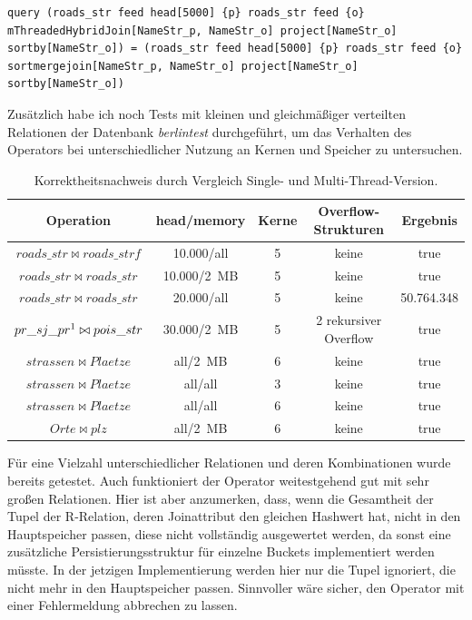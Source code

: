 \documentclass[a4paper,12pt,twoside]{article}
\newcommand{\Fb}[1]{\textit{#1}} %
\begin{document}
{\begin{minipage}{\linewidth}
	\begin{lstlisting}[caption={Beispiel Testqueries für den Join-Operator}, label=list:testjoin]
	query (roads_str feed head[5000] {p} roads_str feed {o} mThreadedHybridJoin[NameStr_p, NameStr_o] project[NameStr_o] sortby[NameStr_o]) = (roads_str feed head[5000] {p} roads_str feed {o} sortmergejoin[NameStr_p, NameStr_o] project[NameStr_o] sortby[NameStr_o])
	\end{lstlisting}
\end{minipage}

Zusätzlich habe ich noch Tests mit kleinen und gleichmäßiger verteilten Relationen der Datenbank \Fb{berlintest} durchgeführt, um das Verhalten des Operators bei unterschiedlicher Nutzung an Kernen und Speicher zu untersuchen. 

\begin{table}
	\centering
	\begin{tabular}{|c|c|c|c|c|}
		\hline 
		Operation & head/memory & Kerne & Overflow-Strukturen & Ergebnis \\ 
		\hline 
		$roads\_str \bowtie roads\_strf$ & 10.000/all & 5 & keine & true \\ 
		\hline 
		$roads\_str \bowtie roads\_str$ & 10.000/2~MB & 5 & keine & true \\ 
		\hline 
		$roads\_str \bowtie roads\_str$ & 20.000/all & 5 & keine & 50.764.348 \\ 
		\hline 
		$pr\_sj\_pr\footnotemark \bowtie pois\_str$ & 30.000/2~MB & 5 & 2 rekursiver Overflow & true \\ 
		\hline 
		$strassen \bowtie Plaetze$ & all/2~MB & 6 & keine  & true \\ 
		\hline
		$strassen \bowtie Plaetze$ & all/all & 3 & keine & true \\ 
		\hline
		$strassen \bowtie Plaetze$ & all/all & 6 & keine & true \\ 
		\hline
		$Orte \bowtie plz$ & all/2~MB & 6 & keine & true \\ 
		\hline
	\end{tabular}
	\caption{\label{tab:testJoin} Korrektheitsnachweis durch Vergleich Single- und Multi-Thread-Version.}
\end{table}


Für eine Vielzahl unterschiedlicher Relationen und deren Kombinationen wurde bereits getestet. Auch funktioniert der Operator weitestgehend gut mit sehr großen Relationen. Hier ist aber anzumerken, dass, wenn die Gesamtheit der Tupel der R-Relation, deren Joinattribut den gleichen Hashwert hat, nicht in den Hauptspeicher passen, diese nicht vollständig ausgewertet werden, da sonst eine zusätzliche Persistierungsstruktur für einzelne Buckets implementiert werden müsste. In der jetzigen Implementierung werden hier nur die Tupel ignoriert, die nicht mehr in den Hauptspeicher passen. Sinnvoller wäre sicher, den Operator mit einer Fehlermeldung abbrechen zu lassen.

}
\end{document}
